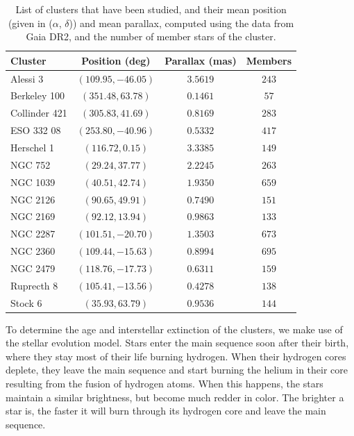 \documentclass[twocolumn]{revtex4}
\begin{document}
\begin{table}[h!]
\begin{tabular}{|l|c|c|c|}
\hline
\textbf{Cluster} & \textbf{Position (deg)} & \textbf{Parallax (mas)} & \textbf{Members} \\
\hline
Alessi 3 & $(109.95, -46.05)$ & $3.5619$ & $243$ \\
\hline
Berkeley 100 & $(351.48, 63.78)$ & $0.1461$ & $57$ \\
\hline
Collinder 421 & $(305.83, 41.69)$ & $0.8169$ & $283$ \\
\hline
ESO 332 08 & $(253.80, -40.96)$ & $0.5332$ & $417$ \\
\hline
Herschel 1 & $(116.72, 0.15)$ & $3.3385$ & $149$ \\
\hline
NGC 752 & $(29.24, 37.77)$ & $2.2245$ & $263$ \\
\hline
NGC 1039 & $(40.51, 42.74)$ & $1.9350$ & $659$ \\
\hline
NGC 2126 & $(90.65, 49.91)$ & $0.7490$ & $151$ \\
\hline
NGC 2169 & $(92.12, 13.94)$ & $0.9863$ & $133$ \\
\hline
NGC 2287 & $(101.51, -20.70)$ & $1.3503$ & $673$ \\
\hline
NGC 2360 & $(109.44, -15.63)$ & $0.8994$ & $695$ \\
\hline
NGC 2479 & $(118.76, -17.73)$ & $0.6311$ & $159$ \\
\hline
Ruprecth 8 & $(105.41, -13.56)$ & $0.4278$ & $138$ \\
\hline
Stock 6 & $(35.93, 63.79)$ & $0.9536$ & $144$ \\
\hline
\end{tabular}
\caption{List of clusters that have been studied, and their mean position (given in ($\alpha$, $\delta$)) and mean parallax, computed using the data from Gaia DR2, and the number of member stars of the cluster.} %
\label{tab:clusters}
\end{table}

To determine the age and interstellar extinction of the clusters, we make use of the stellar evolution model. Stars enter the main sequence soon after their birth, where they stay most of their life burning hydrogen. When their hydrogen cores deplete, they leave the main sequence and start burning the helium in their core resulting from the fusion of hydrogen atoms. When this happens, the stars maintain a similar brightness, but become much redder in color. The brighter a star is, the faster it will burn through its hydrogen core and leave the main sequence.
\end{document}
